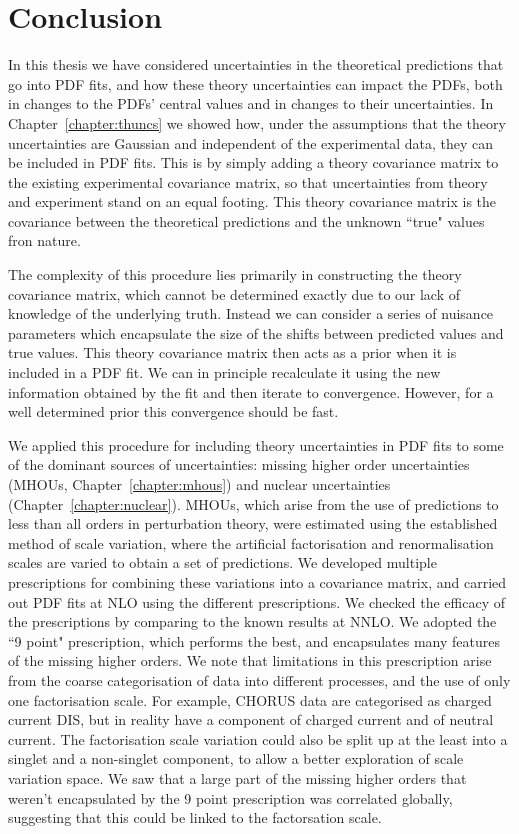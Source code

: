 \chapter{Conclusion}

In this thesis we have considered uncertainties in the theoretical predictions that go into PDF fits, and how these theory uncertainties can impact the PDFs, both in changes to the PDFs' central values and in changes to their uncertainties. In Chapter~\ref{chapter:thuncs} we showed how, under the assumptions that the theory uncertainties are Gaussian and independent of the experimental data, they can be included in PDF fits. This is by simply adding a theory covariance matrix to the existing experimental covariance matrix, so that uncertainties from theory and experiment stand on an equal footing. This theory covariance matrix is the covariance between the theoretical predictions and the unknown ``true" values fron nature.

The complexity of this procedure lies primarily in constructing the theory covariance matrix, which cannot be determined exactly due to our lack of knowledge of the underlying truth. Instead we can consider a series of nuisance parameters which encapsulate the size of the shifts between predicted values and true values. This theory covariance matrix then acts as a prior when it is included in a PDF fit. We can in principle recalculate it using the new information obtained by the fit and then iterate to convergence. However, for a well determined prior this convergence should be fast. 

We applied this procedure for including theory uncertainties in PDF fits to some of the dominant sources of uncertainties: missing higher order uncertainties (MHOUs, Chapter~\ref{chapter:mhous}) and nuclear uncertainties (Chapter~\ref{chapter:nuclear}). MHOUs, which arise from the use of predictions to less than all orders in perturbation theory, were estimated using the established method of scale variation, where the artificial factorisation and renormalisation scales are varied to obtain a set of predictions. We developed multiple prescriptions for combining these variations into a covariance matrix, and carried out PDF fits at NLO using the different prescriptions. We checked the efficacy of the prescriptions by comparing to the known results at NNLO. We adopted the ``9 point" prescription, which performs the best, and encapsulates many features of the missing higher orders. We note that limitations in this prescription arise from the  coarse categorisation of data into different processes, and the use of only one factorisation scale. For example, CHORUS data are categorised as charged current DIS, but in reality have a component of charged current and of neutral current. The factorisation scale variation could also be split up at the least into a singlet and a non-singlet component, to allow a better exploration of scale variation space. We saw that a large part of the missing higher orders that weren't encapsulated by the 9 point prescription was correlated globally, suggesting that this could be linked to the factorsation scale.

